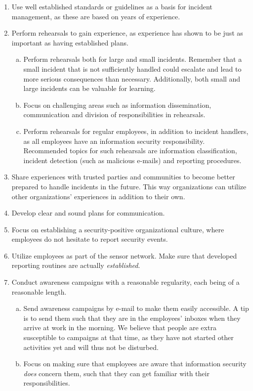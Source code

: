 \begin{enumerate}
\item Use well established standards or guidelines as a basis for incident management, as these are based on years of experience. 
\item Perform rehearsals to gain experience, as experience has shown to be just as important as having established plans.
\begin{enumerate}[a)]
\item Perform rehearsals both for large and small incidents. Remember that a small incident that is not sufficiently handled could escalate and lead to more serious consequences than necessary. Additionally, both small and large incidents can be valuable for learning.
\item Focus on challenging areas such as information dissemination, communication and division of responsibilities in rehearsals.
\item Perform rehearsals for regular employees, in addition to incident handlers, as all employees have an information security responsibility. Recommended topics for such rehearsals are information classification, incident detection (such as malicious e-mails) and reporting procedures. 
\end{enumerate}
\item Share experiences with trusted parties and communities to become better prepared to handle incidents in the future. This way organizations can utilize other organizations' experiences in addition to their own.
\item Develop clear and sound plans for communication.
\item Focus on establishing a security-positive organizational culture, where employees do not hesitate to report security events.
\item Utilize employees as part of the sensor network. Make sure that developed reporting routines are actually \textit{established}.
\item Conduct awareness campaigns with a reasonable regularity, each being of a reasonable length.
\begin{enumerate}[a)]
\item Send awareness campaigns by e-mail to make them easily accessible. A tip is to send them such that they are in the employees' inboxes when they arrive at work in the morning. We believe that people are extra susceptible to campaigns at that time, as they have not started other activities yet and will thus not be disturbed.
\item Focus on making sure that employees are aware that information security \textit{does} concern them, such that they can get familiar with their responsibilities.

\end{enumerate}
\end{enumerate}
